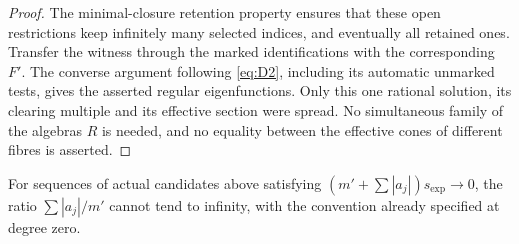\begin{proof}
The minimal-closure retention property ensures that these open
restrictions keep infinitely many selected indices, and eventually all
retained ones. Transfer the witness through the marked identifications
with the corresponding \(F'\). The converse argument following
\eqref{eq:D2}, including its automatic unmarked tests, gives the asserted
regular eigenfunctions. Only this one rational solution, its clearing
multiple and its effective section were spread. No simultaneous family
of the algebras \(R\) is needed, and no equality between the effective
cones of different fibres is asserted.
\end{proof}

\begin{proposition}\label{b:slow-charge-bound}
For sequences of actual candidates above satisfying
\( (m'+\sum|a_j|)s_{\exp}\to0\), the ratio
\(\sum|a_j|/m'\) cannot tend to infinity, with the convention already
specified at degree zero.
\end{proposition}

